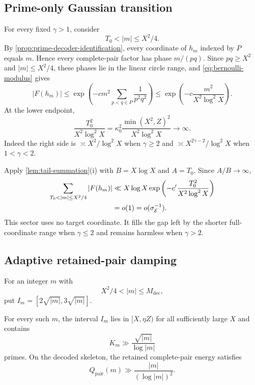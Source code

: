 \subsection{Prime-only Gaussian transition}

For every fixed $\gamma>1$, consider
\begin{equation}
\label{eq:transition-range}
 T_0<|m|\leq X^2/4.
\end{equation}
By \cref{prop:prime-decoder-identification}, every coordinate of $h_m$ indexed by $P$ equals $m$.  Hence every complete-pair factor has phase $m/(pq)$.  Since $pq\geq X^2$ and $|m|\leq X^2/4$, these phases lie in the linear circle range, and \cref{eq:bernoulli-modulus} gives
\begin{equation}
\label{eq:transition-pointwise}
 |F(h_m)|
 \leq\exp\left(-c m^2
   \sum_{p<q\in P}\frac1{p^2q^2}\right)
 \leq\exp\left(-c\frac{m^2}{X^2\log^2X}\right).
\end{equation}
At the lower endpoint,
\begin{equation}
\label{eq:transition-lower-exponent}
 \frac{T_0^2}{X^2\log^2X}
 =\kappa_0^2\frac{\min(X^2,Z)^2}{X^2\log^2X}
 \longrightarrow\infty.
\end{equation}
Indeed the right side is $\asymp X^2/\log^2X$ when $\gamma\geq2$ and $\asymp X^{2\gamma-2}/\log^2X$ when $1<\gamma<2$.

Apply \cref{lem:tail-summation}(i) with $B=X\log X$ and $A=T_0$.  Since $A/B\to\infty$,
\begin{align}
 \sum_{T_0<|m|\leq X^2/4}|F(h_m)|
 &\ll X\log X\exp\left(-c'\frac{T_0^2}{X^2\log^2X}\right)\notag\\
 &=o(1)=o(\sigma_{\mathcal E}^{-1}).
 \label{eq:transition-total}
\end{align}
This sector uses no target coordinate.  It fills the gap left by the shorter full-coordinate range when $\gamma\leq2$ and remains harmless when $\gamma>2$.

\subsection{Adaptive retained-pair damping}

For an integer $m$ with
\[
 X^2/4<|m|\leq M_{\mathrm{dec}},
\]
put $I_m=[2\sqrt{|m|},3\sqrt{|m|}]$.

\begin{proposition}
\label{prop:adaptive-prime-interval}
For every such $m$, the interval $I_m$ lies in $[X,\eta Z)$ for all sufficiently large $X$ and contains
\[
 K_m\gg\frac{\sqrt{|m|}}{\log|m|}
\]
primes.  On the decoded skeleton, the retained complete-pair energy satisfies
\begin{equation}
\label{eq:adaptive-energy}
 Q_{\mathrm{pair}}(m)\gg\frac{|m|}{(\log|m|)^2}.
\end{equation}
\end{proposition}

